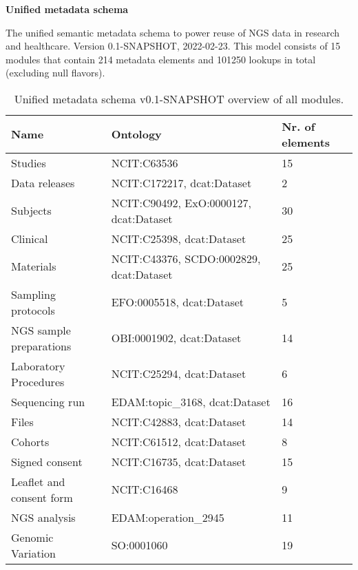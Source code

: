 \documentclass{article}
\begin{document}
\setlength\parindent{0pt}

\textbf{Unified metadata schema}
\newline

The unified semantic metadata schema to power reuse of NGS data in research and healthcare. Version 0.1-SNAPSHOT, 2022-02-23. This model consists of 15 modules that contain 214 metadata elements and 101250 lookups in total (excluding null flavors).

\begin{table}[htb]
\begin{tabular}{lll}
Name & Ontology & Nr. of elements \\
\hline
Studies & NCIT:C63536  & 15 \\
Data releases & NCIT:C172217, dcat:Dataset  & 2 \\
Subjects & NCIT:C90492, ExO:0000127, dcat:Dataset  & 30 \\
Clinical & NCIT:C25398, dcat:Dataset  & 25 \\
Materials & NCIT:C43376, SCDO:0002829, dcat:Dataset  & 25 \\
Sampling protocols & EFO:0005518, dcat:Dataset  & 5 \\
NGS sample preparations & OBI:0001902, dcat:Dataset  & 14 \\
Laboratory Procedures & NCIT:C25294, dcat:Dataset  & 6 \\
Sequencing run & EDAM:topic\_3168, dcat:Dataset  & 16 \\
Files & NCIT:C42883, dcat:Dataset  & 14 \\
Cohorts & NCIT:C61512, dcat:Dataset  & 8 \\
Signed consent & NCIT:C16735, dcat:Dataset  & 15 \\
Leaflet and consent form & NCIT:C16468  & 9 \\
NGS analysis & EDAM:operation\_2945  & 11 \\
Genomic Variation & SO:0001060  & 19 \\
\hline
\end{tabular}
\caption[Module overview]{\label{table:table1} Unified metadata schema v0.1-SNAPSHOT overview of all modules.}
\end{table}
\end{document}
